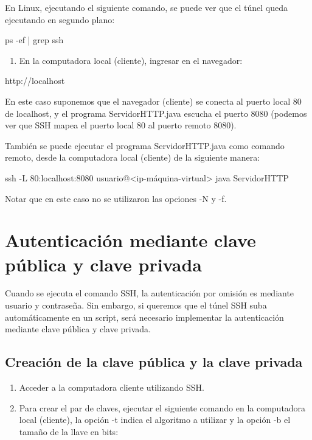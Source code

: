 En Linux, ejecutando el siguiente comando, se puede ver que el túnel queda ejecutando en segundo plano:

\begin{SourceCode}
ps -ef | grep ssh
\end{SourceCode}

\begin{enumerate}

\item En la computadora local (cliente), ingresar en el navegador:

\end{enumerate}

\begin{SourceCode}
http://localhost
\end{SourceCode}

En este caso suponemos que el navegador (cliente) se conecta al puerto local 80 de localhost, y el programa ServidorHTTP.java escucha el puerto 8080 (podemos ver que SSH mapea el puerto local 80 al puerto remoto 8080).

También se puede ejecutar el programa ServidorHTTP.java como comando remoto, desde la computadora local (cliente) de la siguiente manera:

\begin{SourceCode}
ssh -L 80:localhost:8080 usuario@<ip-máquina-virtual> java ServidorHTTP
\end{SourceCode}

Notar que en este caso no se utilizaron las opciones -N y -f.

\section{Autenticación mediante clave pública y clave privada}

Cuando se ejecuta el comando SSH, la autenticación por omisión es mediante usuario y contraseña. Sin embargo, si queremos que el túnel SSH suba automáticamente en un script, será necesario implementar la autenticación mediante clave pública y clave privada.

\subsection{Creación de la clave pública y la clave privada}

\begin{enumerate}

\item Acceder a la computadora cliente utilizando SSH.

\item Para crear el par de claves, ejecutar el siguiente comando en la computadora local (cliente), la opción -t indica el algoritmo a utilizar y la opción -b el tamaño de la llave en bits:

\end{enumerate}

